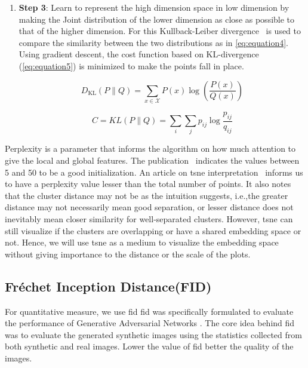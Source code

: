 \begin{enumerate}
    \item \textbf{Step 3}: Learn to represent the high dimension space in low dimension by making the Joint distribution of the lower dimension as close as possible to that of the higher dimension.
    For this Kullback-Leiber divergence~\cite{Joyce2011} is used to compare the similarity between the two distributions as in \autoref{eq:equation4}.
    Using gradient descent, the cost function based on KL-divergence (\autoref{eq:equation5}) is minimized to make the points fall in place.

    \begin{equation}
        D_{\mathrm{KL}}(P \| Q)=\sum_{x \in \mathcal{X}} P(x) \log \left(\frac{P(x)}{Q(x)}\right)
        \label{eq:equation4}
    \end{equation}

    \begin{equation}
        C=K L(P \| Q)=\sum_{i} \sum_{j} p_{i j} \log \frac{p_{i j}}{q_{i j}}
        \label{eq:equation5}
    \end{equation}
\end{enumerate}

Perplexity is a parameter that informs the algorithm on how much attention to give the local and global features.
The publication~\cite{vanDerMaaten2008} indicates the values between 5 and 50 to be a good initialization.
An article on \gls{tsne} interpretation~\cite{wattenberg2016how} informs us to have a perplexity value lesser than the total number of points.
It also notes that the cluster distance may not be as the intuition suggests, i.e.,the greater distance may not necessarily mean good separation, or lesser distance does not inevitably mean closer similarity for well-separated clusters.
However, \gls{tsne} can still visualize if the clusters are overlapping or have a shared embedding space or not.
Hence, we will use \gls{tsne} as a medium to visualize the embedding space without giving importance to the distance or the scale of the plots.

\subsection{Fr\'echet Inception Distance(FID)}\label{subsec:fr'echet-inception-distance)}
For quantitative measure, we use \gls{fid}
\gls{fid} \cite{Heusel2017GANsTB} was specifically formulated to evaluate the performance of Generative Adversarial Networks \cite{Goodfellow2014}.
The core idea behind \gls{fid} was to evaluate the generated synthetic images using the statistics collected from both synthetic and real images.
Lower the value of \gls{fid} better the quality of the images.

